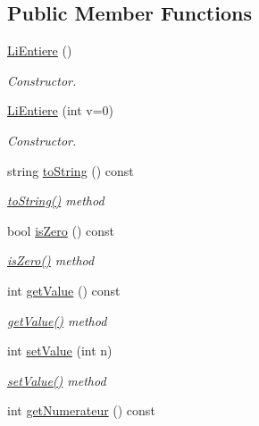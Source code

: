 \subsection*{Public Member Functions}
\begin{DoxyCompactItemize}
\item 
\hyperlink{class_li_entiere_ac49b914ca5fc86f212095bc750375959}{Li\+Entiere} ()
\begin{DoxyCompactList}\small\item\em Constructor. \end{DoxyCompactList}\item 
\hyperlink{class_li_entiere_a5bef763146703f9a49b723715a39973b}{Li\+Entiere} (int v=0)
\begin{DoxyCompactList}\small\item\em Constructor. \end{DoxyCompactList}\item 
string \hyperlink{class_li_entiere_a48fceee2e4f1d481b923ebb28a085baf}{to\+String} () const 
\begin{DoxyCompactList}\small\item\em \hyperlink{class_li_entiere_a48fceee2e4f1d481b923ebb28a085baf}{to\+String()} method \end{DoxyCompactList}\item 
bool \hyperlink{class_li_entiere_a21645454b355997a8a73156900546cbd}{is\+Zero} () const 
\begin{DoxyCompactList}\small\item\em \hyperlink{class_li_entiere_a21645454b355997a8a73156900546cbd}{is\+Zero()} method \end{DoxyCompactList}\item 
int \hyperlink{class_li_entiere_a83bbae276cdb1946b18d913f99bab0e7}{get\+Value} () const 
\begin{DoxyCompactList}\small\item\em \hyperlink{class_li_entiere_a83bbae276cdb1946b18d913f99bab0e7}{get\+Value()} method \end{DoxyCompactList}\item 
int \hyperlink{class_li_entiere_a41212cd9454b1c3a56867b412a4d057e}{set\+Value} (int n)
\begin{DoxyCompactList}\small\item\em \hyperlink{class_li_entiere_a41212cd9454b1c3a56867b412a4d057e}{set\+Value()} method \end{DoxyCompactList}\item 
int \hyperlink{class_li_entiere_af07e732cc94ac20f64d62031fe54cd06}{get\+Numerateur} () const 

\end{DoxyCompactItemize}
